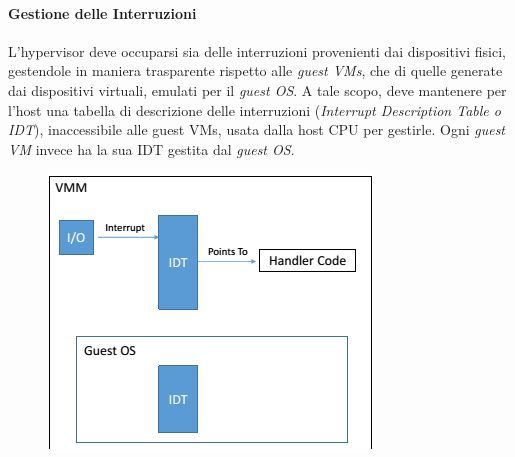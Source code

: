 \documentclass{article}
\begin{document}
\paragraph{Gestione delle Interruzioni}
L’hypervisor deve occuparsi sia delle interruzioni provenienti dai dispositivi fisici, gestendole in maniera trasparente rispetto alle \textit{guest VMs}, che di quelle generate dai dispositivi virtuali, emulati per il \textit{guest OS}.
A tale scopo, deve mantenere per l’host una tabella di descrizione delle interruzioni (\textit{Interrupt Description Table o IDT}), inaccessibile alle guest VMs, usata dalla host CPU per gestirle. Ogni \textit{guest VM} invece ha la sua IDT gestita dal \textit{guest OS}.
\begin{figure}[H]
    \centering
    \includegraphics[scale=0.8]{img/Virt_tech/15.png}   
    \caption{}
\end{figure}\noindent
\end{document}
